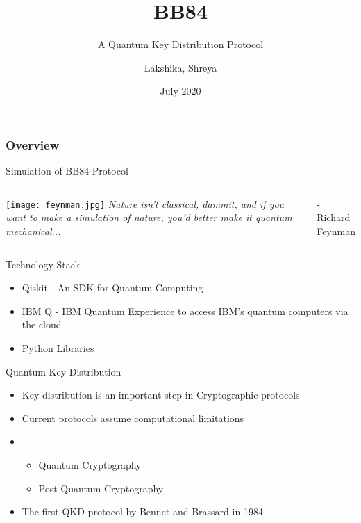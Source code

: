 \documentclass{beamer}
\title[BB84]{BB84}
\subtitle{A Quantum Key Distribution Protocol}
\author[Team 37]{Lakshika, Shreya}
\date{July 2020}
\begin{document}
\begin{frame}
	\titlepage
\end{frame}

\begin{frame}
	\frametitle{Overview}
	 Simulation of BB84 Protocol
\end{frame}


\begin{frame}[standout]
    \begin{columns}
            \centering
            \texttt{[image: feynman.jpg]}
            \emph{Nature isn’t classical, dammit, and if you want to make a simulation of nature, you’d better make it quantum mechanical...}
        \begin{flushright}
            - Richard Feynman
        \end{flushright}
    \end{columns}
\end{frame}


\begin{frame}{Technology Stack}
	\begin{itemize}
		\item Qiskit - An SDK for Quantum Computing
		\item IBM Q - IBM Quantum Experience to access IBM's quantum computers via the cloud
        \item Python Libraries
	\end{itemize}
\end{frame}


\begin{frame}{Quantum Key Distribution}
    \begin{itemize}[<+->]
        \item Key distribution is an important step in Cryptographic protocols
        \item Current protocols assume computational limitations
        \item \begin{itemize}
                \item Quantum Cryptography
                \item Post-Quantum Cryptography
              \end{itemize}
        \item The first QKD protocol by Bennet and Brassard in 1984
     \end{itemize}
\end{frame}
\end{document}
